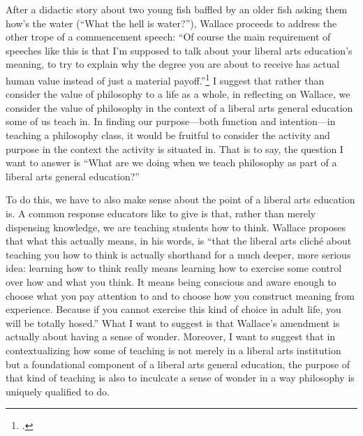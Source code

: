 \documentclass[letterpaper,notitlepage,12pt]{article}
\begin{document}
After a didactic story about two young fish baffled by an older fish asking them
how's the water (``What the hell is water?''), Wallace proceeds to address the
other trope of a commencement speech: ``Of course the main requirement of
speeches like this is that I’m supposed to talk about your liberal arts
education’s meaning, to try to explain why the degree you are about to receive
has actual human value instead of just a material
payoff.''\footcite{david_foster_wallace_this_2005} 
I suggest that rather than consider the value of philosophy to a life as a
whole, in reflecting on Wallace, we consider the value of philosophy in the
context of a liberal arts general education some of us teach in.
In finding our purpose---both function and intention---in teaching a
philosophy class, it would be fruitful to consider the activity and purpose in
the context the activity is situated in.
That is to say, the question I want to answer is ``What are we doing when we
teach philosophy as part of a liberal arts general education?''

To do this, we have to also make sense about the point of a liberal arts
education is.
A common response educators like to give is that, rather than merely dispensing
knowledge, we are teaching students how to think.
Wallace proposes that what this actually means, in his words, is ``that the 
liberal arts clich\'e about teaching you how to think is actually shorthand for a
much deeper, more serious idea: learning how to think really means learning how
to exercise some control over how and what you think. 
It means being conscious
and aware enough to choose what you pay attention to and to choose how you
construct meaning from experience.  
Because if you cannot exercise this kind of choice in adult life, you will be
totally hosed.''
What I want to suggest is that Wallace's amendment is actually about having a
sense of wonder.
Moreover, I want to suggest that in contextualizing how some of teaching is not
merely in a liberal arts institution but a foundational component of a
liberal arts general education, the purpose of that kind of teaching is also to
inculcate a sense of wonder in a way philosophy is uniquely qualified to do.
\end{document}
